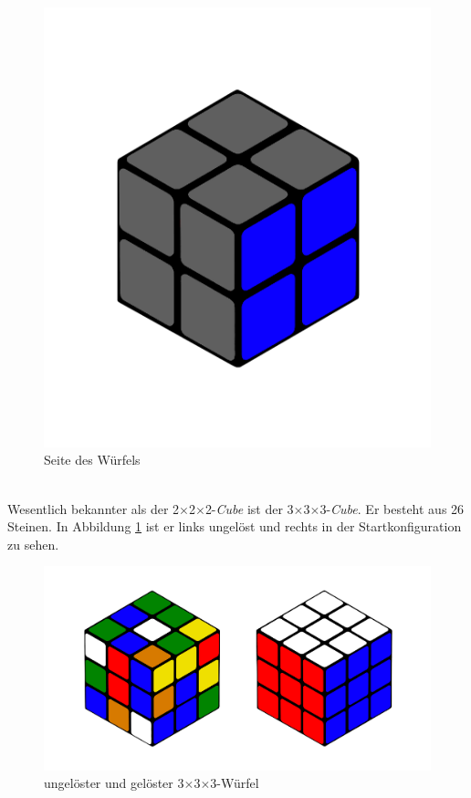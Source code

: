 \documentclass[12pt,a4paper, usenames, dvipsnames]{article}
\theoremstyle{mystyle}
\theoremstyle{definition}
\newcommand{\Ttwo}{2$\times$2$\times$2-}
\newcommand{\Tthree}{3$\times$3$\times$3-}
\begin{document}
\begin{description}
\begin{figure}[h]
\centering
\includegraphics[scale=0.1]{2x2seite.png}
\caption[Seite des Würfels]{Seite des Würfels}
\end{figure}


\item[\Tthree Würfel] \ \\
Wesentlich bekannter als der \Ttwo \textit{Cube} ist der \Tthree \textit{Cube}. Er besteht aus 26 Steinen. In Abbildung \ref{Abbildung_3erWürfel} ist er links ungelöst und rechts in der Startkonfiguration zu sehen.

\begin{figure}[h]
\centering
\includegraphics[scale=0.11]{3x3_sc_so.png}
\caption[ungelöster und gelöster \Tthree Würfel]{ungelöster und gelöster \Tthree Würfel}
\label{Abbildung_3erWürfel}
\end{figure}


\end{description}
\end{document}
